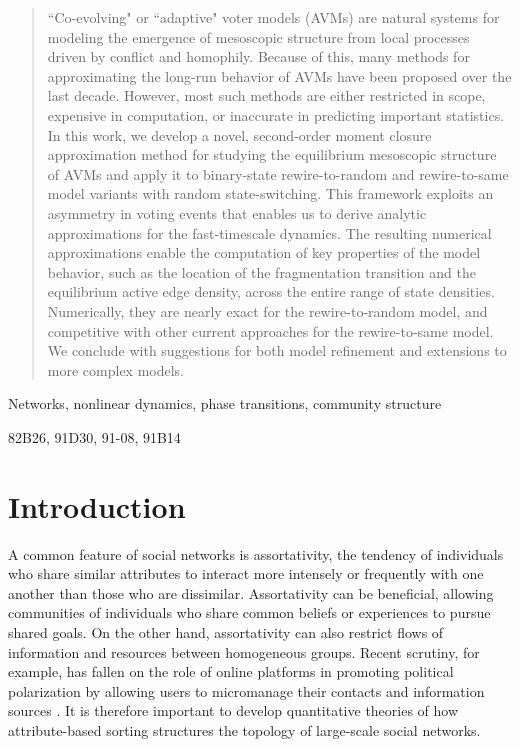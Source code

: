 \documentclass[review, onefignum, onetabnum]{siamart171218}
\begin{document}
\maketitle

\begin{abstract}
	``Co-evolving" or ``adaptive" voter models (AVMs) are natural systems for modeling the emergence of mesoscopic structure from local processes driven by conflict and homophily. 
	Because of this, many methods for approximating the long-run behavior of AVMs have been proposed over the last decade. 
	However, most such methods are either restricted in scope, expensive in computation, or inaccurate in predicting important statistics.  
	In this work, we develop a novel, second-order moment closure approximation method for studying the equilibrium mesoscopic structure of AVMs and apply it to binary-state rewire-to-random and rewire-to-same model variants with random state-switching. 
	This framework exploits an asymmetry in voting events that enables us to derive analytic approximations for the fast-timescale dynamics. 
	The resulting numerical approximations enable the computation of key properties of the model behavior, such as the location of the fragmentation transition and the equilibrium active edge density, across the entire range of state densities. 
	Numerically, they are nearly exact for the rewire-to-random model, and competitive with other current approaches for the rewire-to-same model. 
	We conclude with suggestions for both model refinement and extensions to more complex models. 
	
\end{abstract}

\begin{keywords}
	Networks, nonlinear dynamics, phase transitions, community structure
\end{keywords}
\begin{AMS}
	82B26, %
	91D30, %
	91-08, %
	91B14  %
\end{AMS}

\section{Introduction} \label{sec:intro}

	A common feature of social networks is assortativity, the tendency of individuals who share similar attributes to interact more intensely or frequently with one another than those who are dissimilar.
	Assortativity can be beneficial, allowing communities of individuals who share common beliefs or experiences to pursue shared goals. 
	On the other hand, assortativity can also restrict flows of information and resources between homogeneous groups. 
	Recent scrutiny, for example, has fallen on the role of online platforms in promoting political polarization by allowing users to micromanage their contacts and information sources \cite{Anagnostopoulos2014,Bakshy2015}. 
	It is therefore important to develop quantitative theories of how attribute-based sorting structures the topology of large-scale social networks. 
	
\end{document}
